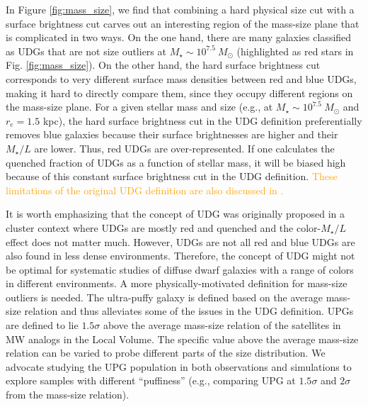 \documentclass[twocolumn,astrosymb,twocolappendix,linenumbers]{aastex631}
\newcommand{\emphasize}{\textcolor{orange}}
\begin{document}
\begin{CJK*}{UTF8}{gbsn}
In Figure \ref{fig:mass_size}, we find that combining a hard physical size cut with a surface brightness cut carves out an interesting region of the mass-size plane that is complicated in two ways. On the one hand, there are many galaxies classified as UDGs that are not size outliers at $M_\star \sim 10^{7.5}\ M_\odot$ (highlighted as red stars in Fig. \ref{fig:mass_size}). On the other hand, the hard surface brightness cut corresponds to very different surface mass densities between red and blue UDGs, making it hard to directly compare them, since they occupy different regions on the mass-size plane. For a given stellar mass and size (e.g., at $M_\star \sim 10^{7.5}\ M_\odot$ and $r_e = 1.5$ kpc), the hard surface brightness cut in the UDG definition preferentially removes blue galaxies because their surface brightnesses are higher and their $M_\star/L$ are lower. Thus, red UDGs are over-represented. If one calculates the quenched fraction of UDGs as a function of stellar mass, it will be biased high because of this constant surface brightness cut in the UDG definition. \emphasize{These limitations of the original UDG definition are also discussed in \citet{Trujillo2017,ManceraPina2018}.}

It is worth emphasizing that the concept of UDG was originally proposed in a cluster context where UDGs are mostly red and quenched \citep[e.g.,][]{vanDokkum2015} and the color-$M_\star/L$ effect does not matter much. However, UDGs are not all red and blue UDGs are also found in less dense environments. Therefore, the concept of UDG might not be optimal for systematic studies of diffuse dwarf galaxies with a range of colors in different environments. A more physically-motivated definition for mass-size outliers is needed. The ultra-puffy galaxy is defined based on the average mass-size relation and thus alleviates some of the issues in the UDG definition. UPGs are defined to lie $1.5\sigma$ above the average mass-size relation of the satellites in MW analogs in the Local Volume. The specific value above the average mass-size relation can be varied to probe different parts of the size distribution. We advocate studying the UPG population in both observations and simulations to explore samples with different ``puffiness'' (e.g., comparing UPG at $1.5\sigma$ and $2\sigma$ from the mass-size relation). 



\end{CJK*}
\end{document}
